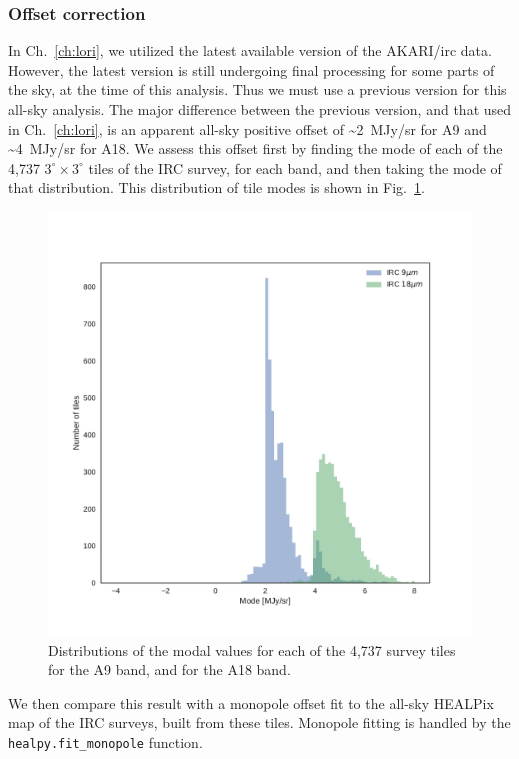     \subsubsection{Offset correction}
    In Ch.~\ref{ch:lori}, we utilized the latest available version of the AKARI/\acrshort{irc} data. However, the latest version is still undergoing final processing for some parts of the sky, at the time of this analysis. Thus we must use a previous version for this all-sky analysis. The major difference between the previous version, and that used in Ch.~\ref{ch:lori}, is an apparent all-sky positive offset of \textasciitilde{}2~MJy/sr for A9 and \textasciitilde{}4~MJy/sr for A18. We assess this offset first by finding the mode of each of the 4,737 $3^{\circ}\times3^{\circ}$ tiles of the IRC survey, for each band, and then taking the mode of that distribution. This distribution of tile modes is shown in Fig.~\ref{fig:allsky_2016_tilemodes}.
        \begin{figure}
          \includegraphics[width=\textwidth]{../Plots/ch_allsky/IRC_offset_correction.pdf}
          \centering
          \caption{Distributions of the modal values for each of the 4,737 survey tiles for the A9 band, and for the A18 band.}
          \label{fig:allsky_2016_tilemodes}
        \end{figure}
      We then compare this result with a monopole offset fit to the all-sky HEALPix map of the IRC surveys, built from these tiles. Monopole fitting is handled by the {\tt healpy.fit\_monopole} function.
